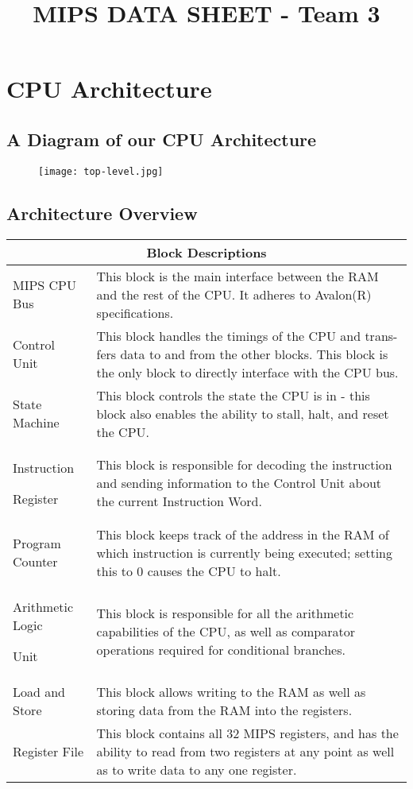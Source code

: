 \documentclass{article}
\title{MIPS DATA SHEET - Team 3\vspace{-2em}}
\date{}
\begin{document}
\maketitle

\section{CPU Architecture}

\subsection{A Diagram of our CPU Architecture}

\begin{figure}[htp]
\centering
\texttt{[image: top-level.jpg]}
\end{figure}

\subsection{Architecture Overview}

\begin{tabular}[htp]{ |p{3cm}|p{8cm}|}
\hline
\multicolumn{2}{|c|}{Block Descriptions} \\
\hline
MIPS CPU Bus & This block is the main interface between the RAM
and the rest of the CPU. It adheres to Avalon(R)
specifications.  \\
Control Unit & This block handles the timings of the CPU and trans-
fers data to and from the other blocks. This block 
is the only block to directly interface with the CPU 
bus. \\
State Machine & This block controls the state the CPU is 
in - this block also enables the ability to stall, halt, 
and reset the CPU.  \\
Instruction 

Register & This block is responsible for decoding the instruction
and sending information to the Control Unit about 
the current Instruction Word. \\
Program Counter & This block keeps track of the address in the RAM of 
which instruction is currently being executed; setting this to 0 causes the CPU to halt. \\
Arithmetic Logic 

Unit & This block is responsible for all the arithmetic capabilities of the CPU, as well as comparator operations required for conditional branches.  \\
Load and Store & This block allows writing to the RAM as well as storing data from the RAM into the registers.  \\
Register File & This block contains all 32 MIPS registers, and has the ability to read from two registers at any point as well as to write data to any one register.\\
\hline
\end{tabular}
\end{document}

